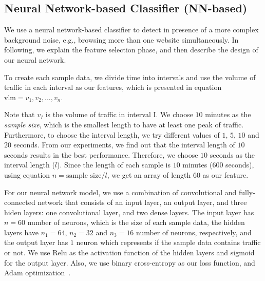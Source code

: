 \subsection{Neural Network-based Classifier (NN-based)}\label{class:nn}
We use a neural network-based classifier to detect \bc in presence of a more complex background noise, e.g., browsing more than one website simultaneously. In following, we explain the feature selection phase, and then describe the design of our neural network.

To create each sample data, we divide time into intervals
and use the volume of traffic in each interval as our features, which is 
presented in equation $\mbox{vlm}=v_1, v_2, ..., v_{n}$. 

Note that $v_I$ is the volume of traffic in interval I. We choose $10$ minutes as the \textit{sample size}, which is the smallest length to have
at least one peak of traffic. Furthermore, to choose the interval
length, we try different values of $1$, $5$, $10$ and $20$ seconds. From our experiments, we find out 
that the interval length of $10$ seconds results in the best performance. Therefore, we choose $10$ 
seconds as the interval length ($l$). 
Since the length of each sample is $10$ minutes 
($600$ seconds), using equation $n=\mbox{sample size}/l$, we get an array of 
length $60$ as our feature.
\iffalse
\begin{equation}\label{eq:v}
 n=\mbox{sample size}/l
\end{equation}
\begin{equation}\label{eq:a}
\mbox{vlm}=v_1, v_2, ..., v_{n}
\end{equation}\fi

For our neural network model, we use a combination of convolutional and fully-connected network that 
consists of an input layer, an output layer, and three hiden layers: one convolutional layer, and two dense layers. The input layer has $n=60$ number of neurons, which is the size of each sample data, the hidden layers have $n_1=64$, $n_2=32$ and $n_3 = 16$ number of neurons, respectively, and the output layer has $1$ neuron which represents if the sample data contains \bc 
traffic or not. We use Relu as the activation function of the hidden layers and 
sigmoid~\cite{deep_learning_book} for the output layer. Also, we use binary cross-entropy as our loss function, and Adam optimization~\cite{adam}.%

